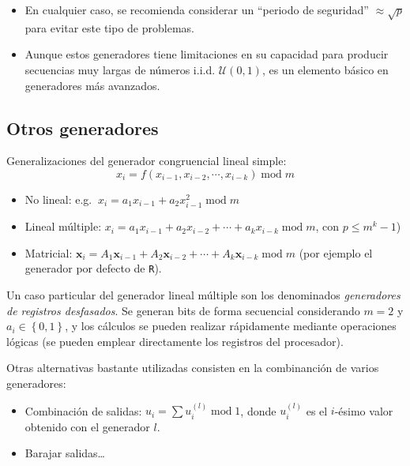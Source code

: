\documentclass[]{book}
\theoremstyle{definition}
\theoremstyle{definition}
\theoremstyle{definition}
\theoremstyle{remark}
\begin{document}
\begin{itemize}
\item
  En cualquier caso, se recomienda considerar un ``periodo de
  seguridad'' \(\approx \sqrt{p}\) para evitar este tipo de problemas.
\item
  Aunque estos generadores tiene limitaciones en su capacidad para
  producir secuencias muy largas de números i.i.d. \(\mathcal{U}(0,1)\),
  es un elemento básico en generadores más avanzados.
\end{itemize}

\subsection{Otros generadores}\label{otros-generadores}

Generalizaciones del generador congruencial lineal simple:
\[x_{i}=f\left(  x_{i-1},x_{i-2},\cdots,x_{i-k}\right)  \operatorname{mod}m\]

\begin{itemize}
\item
  No lineal: e.g.
  \(\ x_{i}=a_{1}x_{i-1}+a_{2}x_{i-1}^{2}\operatorname{mod}m\)
\item
  Lineal múltiple:
  \(x_{i}=a_{1}x_{i-1}+a_{2}x_{i-2}+\cdots+a_{k}x_{i-k}\operatorname{mod}m\),
  con \(p\leq m^{k}-1\))
\item
  Matricial:
  \(\boldsymbol{x}_{i} = A_{1}\boldsymbol{x}_{i-1} + A_{2}\boldsymbol{x}_{i-2} + \cdots + A_{k}\boldsymbol{x}_{i-k} \operatorname{mod}m\)
  (por ejemplo el generador por defecto de \texttt{R}).
\end{itemize}

Un caso particular del generador lineal múltiple son los denominados
\emph{generadores de registros desfasados}. Se generan bits de forma
secuencial considerando \(m=2\) y \(a_{i} \in \left \{ 0,1\right \}\), y
los cálculos se pueden realizar rápidamente mediante operaciones lógicas
(se pueden emplear directamente los registros del procesador).

Otras alternativas bastante utilizadas consisten en la combinanción de
varios generadores:

\begin{itemize}
\item
  Combinación de salidas: \(u_{i}=\sum u_{i}^{(l)}\operatorname{mod}1\),
  donde \(u_{i}^{(l)}\) es el \(i\)-ésimo valor obtenido con el
  generador \(l\).
\item
  Barajar salidas\ldots{}
\end{itemize}
\end{document}
